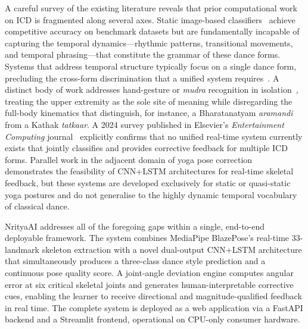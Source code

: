 \documentclass[journal]{IEEEtran}
\begin{document}
A careful survey of the existing literature reveals that prior
computational work on ICD is fragmented along several axes. Static
image-based classifiers~\cite{jain2021} achieve competitive accuracy on
benchmark datasets but are fundamentally incapable of capturing the
temporal dynamics—rhythmic patterns, transitional movements, and
temporal phrasing—that constitute the grammar of these dance forms.
Systems that address temporal structure typically focus on a single
dance form, precluding the cross-form discrimination that a unified
system requires~\cite{naik2021}. A distinct body of work addresses
hand-gesture or \textit{mudra} recognition in isolation~\cite{challapalli2022},
treating the upper extremity as the sole site of meaning while
disregarding the full-body kinematics that distinguish, for instance, a
Bharatanatyam \textit{aramandi} from a Kathak \textit{tatkaar}. A 2024
survey published in Elsevier's \textit{Entertainment Computing}
journal~\cite{survey2024} explicitly confirms that no unified real-time
system currently exists that jointly classifies and provides corrective
feedback for multiple ICD forms. Parallel work in the adjacent domain
of yoga pose correction~\cite{thoutam2022,swain2022} demonstrates the
feasibility of CNN+LSTM architectures for real-time skeletal feedback,
but these systems are developed exclusively for static or quasi-static
yoga postures and do not generalise to the highly dynamic temporal
vocabulary of classical dance.

NrityaAI addresses all of the foregoing gaps within a single, end-to-end
deployable framework. The system combines MediaPipe BlazePose's
real-time 33-landmark skeleton extraction with a novel dual-output
CNN+LSTM architecture that simultaneously produces a three-class
dance style prediction and a continuous pose quality score. A
joint-angle deviation engine computes angular error at six critical
skeletal joints and generates human-interpretable corrective cues,
enabling the learner to receive directional and magnitude-qualified
feedback in real time. The complete system is deployed as a web
application via a FastAPI backend and a Streamlit frontend, operational
on CPU-only consumer hardware.
\end{document}
